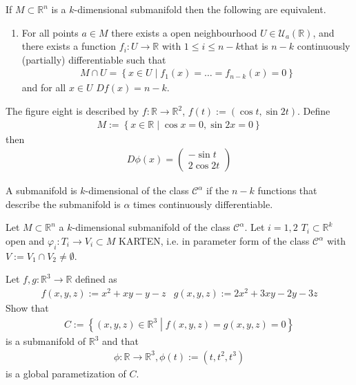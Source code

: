 %
\begin{theorem}
    If \(M \subset \mathbb{R}^n\) is a \(k\)-dimensional submanifold then the following are equivalent.
    \begin{enumerate}
        \item For all points \(a \in M\) there exists a open neighbourhood \(U \in \mathcal{U}_a(\mathbb{R})\), and there exists a function \(f_i: U \rightarrow \mathbb{R}\) with \(1 \leq i \leq n-k\)that is \(n-k\) continuously (partially) differentiable such that
        \begin{align}
            M \cap U = \left\{ x \in U \middle| f_1(x) = \dots = f_{n-k}(x) = 0 \right\}
        \end{align}
        and for all \(x \in U\) \(Df (x) = n-k\).
    \end{enumerate}
\end{theorem}
%
\begin{example}
    The figure eight is described by \(f: \mathbb{R} \rightarrow \mathbb{R}^2\), \(f(t):= (\cos t, \sin 2t)\). Define
    \begin{align}
        M := \left\{ x \in \mathbb{R} \middle | \cos x = 0, \sin 2x = 0 \right\}
    \end{align}
    then
    \begin{align}
        D\phi(x) = \begin{pmatrix}
            -\sin t \\
            2\cos 2t
        \end{pmatrix}
    \end{align}
\end{example}
%
\begin{definition}
    A submanifold is \(k\)-dimensional of the class \(\mathcal{C}^\alpha\) if the \(n-k\) functions that describe the submanifold is \(\alpha\) times continuously differentiable.
\end{definition}
%
\begin{theorem}
    Let \(M \subset \mathbb{R}^n\) a \(k\)-dimensional submanifold of the class \(\mathcal{C}^\alpha\). Let \(i = 1, 2\) \(T_i \subset \mathbb{R}^k\) open and \(\varphi_i: T_i \rightarrow V_i \subset M\) KARTEN, i.e. in parameter form of the class \(\mathcal{C}^\alpha\) with \(V:= V_1 \cap V_2 \neq \emptyset\).
\end{theorem}
%
\begin{question}
    Let \(f, g: \mathbb{R}^3 \rightarrow \mathbb{R}\) defined as
    \begin{align}
        & f(x, y, z) := x^2 + xy - y - z & g(x, y, z) := 2x^2 + 3xy - 2y - 3z &
    \end{align}
    Show that
    \begin{align}
        C := \left\{ (x, y, z) \in \mathbb{R}^3 \middle| f(x, y, z) = g(x, y, z) = 0 \right\}
    \end{align}
    is a submanifold of \(\mathbb{R}^3\) and that
    \begin{align}
        \phi: \mathbb{R} \rightarrow \mathbb{R}^3, \phi(t) := (t, t^2, t^3)
    \end{align}
    is a global parametization of \(C\).
\end{question}